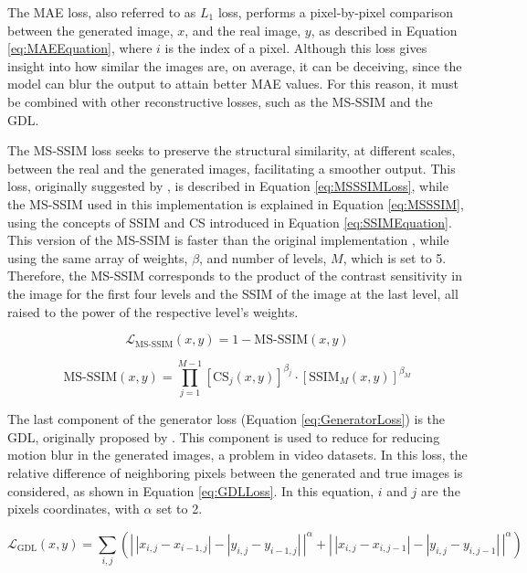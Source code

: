 The MAE loss, also referred to as $L_{1}$ loss, performs a pixel-by-pixel comparison between the generated image, $x$, and the real image, $y$, as described in Equation \ref{eq:MAEEquation}, where $i$ is the index of a pixel. Although this loss gives insight into how similar the images are, on average, it can be deceiving, since the model can blur the output to attain better MAE values. For this reason, it must be combined with other reconstructive losses, such as the MS-SSIM and the GDL.
\par
The MS-SSIM loss seeks to preserve the structural similarity, at different scales, between the real and the generated images, facilitating a smoother output. This loss, originally suggested by \textcite{Wang2003}, is described in Equation \ref{eq:MSSSIMLoss}, while the MS-SSIM used in this implementation is explained in Equation \ref{eq:MSSSIM}, using the concepts of SSIM and CS introduced in Equation \ref{eq:SSIMEquation}. This version of the MS-SSIM is faster than the original implementation \parencite{Wang2003}, while using the same array of weights, $\beta$, and number of levels, $M$, which is set to 5. Therefore, the MS-SSIM corresponds to the product of the contrast sensitivity in the image for the first four levels and the SSIM of the image at the last level, all raised to the power of the respective level's weights.

\begin{equation}
	\mathcal{L}_{\text{MS-SSIM}} (x, y) = 1 - \text{MS-SSIM}(x, y)
	\label{eq:MSSSIMLoss}
\end{equation}

\begin{equation}
	\text{MS-SSIM}(x, y) = \prod_{j=1}^{M-1} \left[ \text{CS}_j(x, y) \right]^{\beta_j} \cdot \left[ \text{SSIM}_M(x, y) \right]^{\beta_M}
	\label{eq:MSSSIM}
\end{equation}

The last component of the generator loss (Equation \ref{eq:GeneratorLoss}) is the GDL, originally proposed by \textcite{Mathieu2016}. This component is used to reduce for reducing motion blur in the generated images, a problem in video datasets. In this loss, the relative difference of neighboring pixels between the generated and true images is considered, as shown in Equation \ref{eq:GDLLoss}. In this equation, $i$ and $j$ are the pixels coordinates, with $\alpha$ set to 2.

\begin{equation}
	\mathcal{L}_{\text{GDL}}(x, y) = \sum_{i,j} \left( \left|\,|x_{i,j} - x_{i-1,j}| - |y_{i,j} - y_{i-1,j}|\,\right|^{\alpha} + \left|\,|x_{i,j} - x_{i,j-1}| - |y_{i,j} - y_{i,j-1}|\,\right|^{\alpha} \right)
	\label{eq:GDLLoss}
\end{equation}

